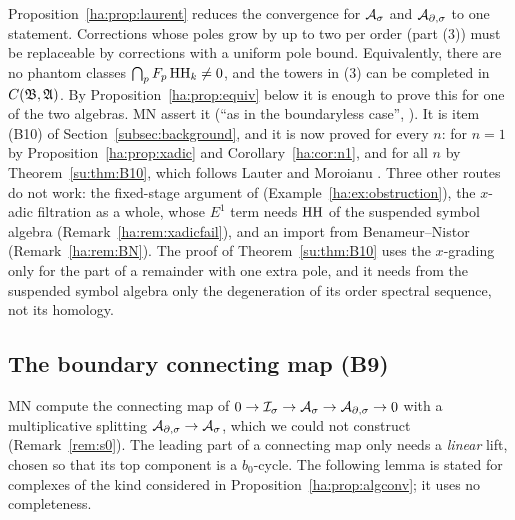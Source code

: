 \begin{remark}\label{ha:rem:quoted}
Proposition~\ref{ha:prop:laurent} reduces the convergence for \(\mathcal A_\sigma\) and
\(\mathcal A_{\partial,\sigma}\) to one statement. Corrections whose poles grow by up to two per
order (part (3)) must be replaceable by corrections with a uniform pole
bound. Equivalently, there are no phantom classes
\(\bigcap_pF_p\operatorname{HH}_k\ne0\), and the towers in (3) can be completed in
\(C(\mathfrak B,\mathfrak A)\). By Proposition~\ref{ha:prop:equiv} below it is
enough to prove this for one of the two algebras. MN assert it (``as in
the boundaryless case'', \cite[p.~12]{MN}). It is item (B10) of
Section~\ref{subsec:background}, and it is now proved for every \(n\):
for \(n=1\) by Proposition~\ref{ha:prop:xadic} and
Corollary~\ref{ha:cor:n1}, and for all \(n\) by Theorem~\ref{su:thm:B10},
which follows Lauter and Moroianu \cite{LauterMoroianu}. Three other
routes do not work: the fixed-stage argument of \cite{HHb}
(Example~\ref{ha:ex:obstruction}), the \(x\)-adic filtration as a whole,
whose \(E^1\) term needs \(\operatorname{HH}\) of the suspended symbol algebra
(Remark~\ref{ha:rem:xadicfail}), and an import from Benameur--Nistor
\cite{BN} (Remark~\ref{ha:rem:BN}). The proof of
Theorem~\ref{su:thm:B10} uses the \(x\)-grading only for the part of a
remainder with one extra pole, and it needs from the suspended symbol
algebra only the degeneration of its order spectral sequence, not its
homology.
\end{remark}

\subsection{The boundary connecting map (B9)}\label{ha:subsec:B9}

MN compute the connecting map of \(0\to\mathcal I_\sigma\to\mathcal A_\sigma\to\mathcal A_{\partial,\sigma}\to0\) with a
multiplicative splitting \(\mathcal A_{\partial,\sigma}\to\mathcal A_\sigma\), which we could not construct
(Remark~\ref{rem:s0}). The leading part of a connecting map only needs a
\emph{linear} lift, chosen so that its top component is a \(b_0\)-cycle.
The following lemma is stated for complexes of the kind considered in
Proposition~\ref{ha:prop:algconv}; it uses no completeness.

